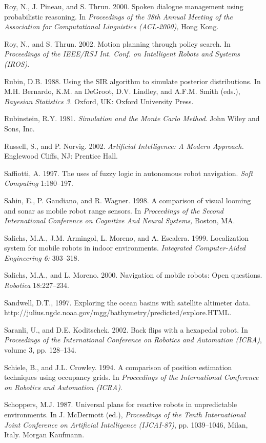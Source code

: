 \documentclass[10pt,a4paper]{article}
\begin{document}
Roy, N., J. Pineau, and S. Thrun. 2000. Spoken dialogue management using probabilistic
reasoning. In \textit{Proceedings of the 38th Annual Meeting of the Association for
Computational Linguistics (ACL-2000),} Hong Kong.

Roy, N., and S. Thrun. 2002. Motion planning through policy search. In \textit{Proceedings
of the IEEE/RSJ Int. Conf. on Intelligent Robots and Systems (IROS)}.

Rubin, D.B. 1988. Using the SIR algorithm to simulate posterior distributions. In
M.H. Bernardo, K.M. an DeGroot, D.V. Lindley, and A.F.M. Smith (eds.), \textit{Bayesian
Statistics 3.} Oxford, UK: Oxford University Press.

Rubinstein, R.Y. 1981. \textit{Simulation and the Monte Carlo Method}. John Wiley and Sons,
Inc.

Russell, S., and P. Norvig. 2002. \textit{Artificial Intelligence: A Modern Approach.} Englewood
Cliffs, NJ: Prentice Hall.

Saffiotti, A. 1997. The uses of fuzzy logic in autonomous robot navigation. \textit{Soft
Computing} 1:180–197.

Sahin, E., P. Gaudiano, and R. Wagner. 1998. A comparison of visual looming and
sonar as mobile robot range sensors. In \textit{Proceedings of the Second International Conference
on Cognitive And Neural Systems,} Boston, MA.

Salichs, M.A., J.M. Armingol, L. Moreno, and A. Escalera. 1999. Localization system
for mobile robots in indoor environments. \textit{Integrated Computer-Aided Engineering 6:}
303–318.

Salichs, M.A., and L. Moreno. 2000. Navigation of mobile robots: Open questions.
\textit{Robotica} 18:227–234.

Sandwell, D.T., 1997. Exploring the ocean basins with satellite altimeter data.
http://julius.ngdc.noaa.gov/mgg/bathymetry/predicted/explore.HTML.

Saranli, U., and D.E. Koditschek. 2002. Back flips with a hexapedal robot. In \textit{Proceedings
of the International Conference on Robotics and Automation (ICRA)}, volume 3, pp.
128–134.

Schiele, B., and J.L. Crowley. 1994. A comparison of position estimation techniques
using occupancy grids. In \textit{Proceedings of the International Conference on Robotics and
Automation (ICRA)}.

Schoppers, M.J. 1987. Universal plans for reactive robots in unpredictable environments.
In J. McDermott (ed.), \textit{Proceedings of the Tenth International Joint Conference
on Artificial Intelligence (IJCAI-87)}, pp. 1039–1046, Milan, Italy. Morgan Kaufmann.
\end{document}
